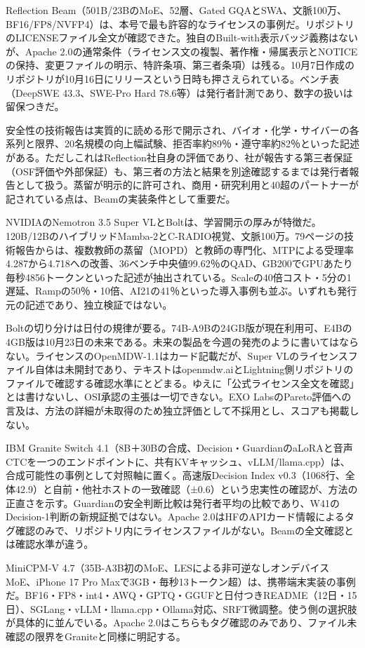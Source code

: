 \documentclass[lualatex,a4paper,10pt]{jlreq}
\begin{document}
Reflection Beam（501B/23BのMoE、52層、Gated GQAとSWA、文脈100万、BF16/FP8/NVFP4）は、本号で最も許容的なライセンスの事例だ。リポジトリのLICENSEファイル全文が確認できた。独自のBuilt-with表示バッジ義務はないが、Apache 2.0の通常条件（ライセンス文の複製、著作権・帰属表示とNOTICEの保持、変更ファイルの明示、特許条項、第三者条項）は残る。10月7日作成のリポジトリが10月16日にリリースという日時も押さえられている。ベンチ表（DeepSWE 43.3、SWE-Pro Hard 78.6等）は発行者計測であり、数字の扱いは留保つきだ。

安全性の技術報告は実質的に読める形で開示され、バイオ・化学・サイバーの各系列と限界、20名規模の向上幅試験、拒否率約89％・遵守率約82％といった記述がある。ただしこれはReflection社自身の評価であり、社が報告する第三者保証（OSF評価や外部保証）も、第三者の方法と結果を別途確認するまでは発行者報告として扱う。蒸留が明示的に許可され、商用・研究利用と40超のパートナーが記されている点は、Beamの実装条件として重要だ。

NVIDIAのNemotron 3.5 Super VLとBoltは、学習開示の厚みが特徴だ。120B/12BのハイブリッドMamba-2とC-RADIO視覚、文脈100万。79ページの技術報告からは、複数教師の蒸留（MOPD）と教師の専門化、MTPによる受理率4.287から4.718への改善、36ベンチ中央値99.62％のQAD、GB200でGPUあたり毎秒4856トークンといった記述が抽出されている。Scaleの40倍コスト・5分の1遅延、Rampの50％・10倍、AI21の41％といった導入事例も並ぶ。いずれも発行元の記述であり、独立検証ではない。

Boltの切り分けは日付の規律が要る。74B-A9Bの24GB版が現在利用可、E4Bの4GB版は10月23日の未来である。未来の製品を今週の発売のように書いてはならない。ライセンスのOpenMDW-1.1はカード記載だが、Super VLのライセンスファイル自体は未開封であり、テキストはopenmdw.aiとLightning側リポジトリのファイルで確認する確認水準にとどまる。ゆえに「公式ライセンス全文を確認」とは書けないし、OSI承認の主張は一切できない。EXO LabsのPareto評価への言及は、方法の詳細が未取得のため独立評価として不採用とし、スコアも掲載しない。

IBM Granite Switch 4.1（8B＋30Bの合成、Decision・GuardianのaLoRAと音声CTCを一つのエンドポイントに、共有KVキャッシュ、vLLM/llama.cpp）は、合成可能性の事例として対照軸に置く。高速版Decision Index v0.3（1068行、全体42.9）と自前・他社ホストの一致確認（±0.6）という忠実性の確認が、方法の正直さを示す。Guardianの安全判断比較は発行者平均の比較であり、W41のDecision-1判断の新規証拠ではない。Apache 2.0はHFのAPIカード情報によるタグ確認のみで、リポジトリ内にライセンスファイルがない。Beamの全文確認とは確認水準が違う。

MiniCPM-V 4.7（35B-A3B初のMoE、LESによる非可逆なしオンデバイスMoE、iPhone 17 Pro Maxで3GB・毎秒13トークン超）は、携帯端末実装の事例だ。BF16・FP8・int4・AWQ・GPTQ・GGUFと日付つきREADME（12日・15日）、SGLang・vLLM・llama.cpp・Ollama対応、SRFT微調整。使う側の選択肢が具体的に並んでいる。Apache 2.0はこちらもタグ確認のみであり、ファイル未確認の限界をGraniteと同様に明記する。
\end{document}

